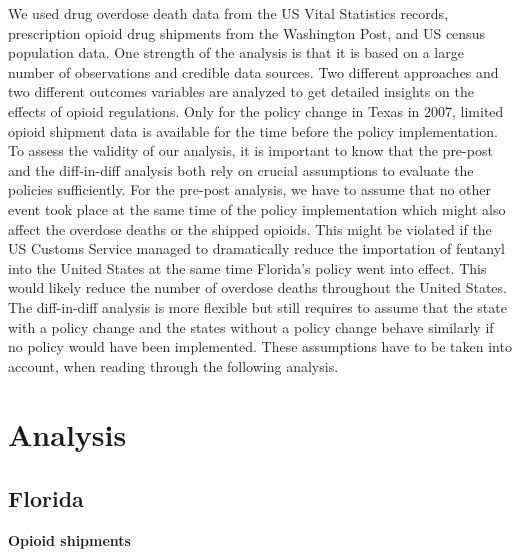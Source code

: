 \documentclass[12pt,letterpaper]{article}
\begin{document}
We used drug overdose death data from the US Vital Statistics records, prescription opioid drug shipments from the Washington Post, and US census population data. One strength of the analysis is that it is based on a large number of observations and credible data sources. Two different approaches and two different outcomes variables are analyzed to get detailed insights on the effects of opioid regulations. Only for the policy change in Texas in 2007, limited opioid shipment data is available for the time before the policy implementation. To assess the validity of our analysis, it is important to know that the pre-post and the diff-in-diff analysis both rely on crucial assumptions to evaluate the policies sufficiently. For the pre-post analysis, we have to assume that no other event took place at the same time of the policy implementation which might also affect the overdose deaths or the shipped opioids. This might be violated if the US Customs Service managed to dramatically reduce the importation of fentanyl into the United States at the same time Florida's policy went into effect. This would likely reduce the number of overdose deaths throughout the United States. The diff-in-diff analysis is more flexible but still requires to assume that the state with a policy change and the states without a policy change behave similarly if no policy would have been implemented. These assumptions have to be taken into account, when reading through the following analysis. 

\section{Analysis}
\subsection{Florida}

\textbf{Opioid shipments}
\end{document}
